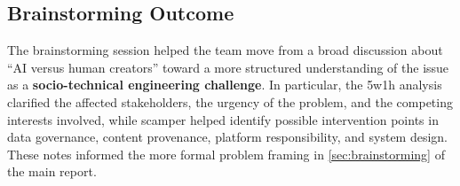 \subsection{Brainstorming Outcome}\label{app:brainstorming-outcome}
The brainstorming session helped the team move from a broad discussion about ``AI versus human creators'' toward a more structured understanding of the issue as a \textbf{socio-technical engineering challenge}. In particular, the \ac{5w1h} analysis clarified the affected stakeholders, the urgency of the problem, and the competing interests involved, while \ac{scamper} helped identify possible intervention points in data governance, content provenance, platform responsibility, and system design. These notes informed the more formal problem framing in \cref{sec:brainstorming} of the main report.
